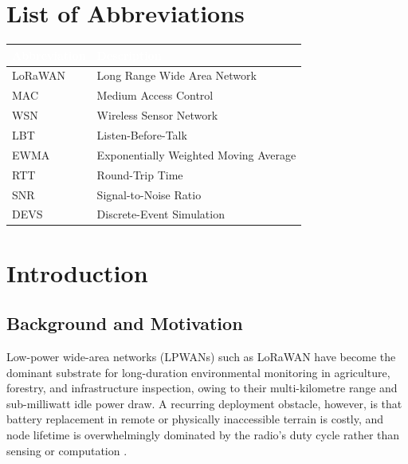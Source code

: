\documentclass[12pt,a4paper]{report}
\begin{document}
\tableofcontents
\listoffigures
\listoftables

\chapter*{List of Abbreviations}
\begin{center}
\begin{tabularx}{0.85\textwidth}{@{}lX@{}}
\toprule
\rowcolor{nustgreen}
\textcolor{white}{\bfseries Abbreviation} & \textcolor{white}{\bfseries Description} \\
\midrule
LoRaWAN & Long Range Wide Area Network \\
MAC     & Medium Access Control \\
WSN     & Wireless Sensor Network \\
LBT     & Listen-Before-Talk \\
EWMA    & Exponentially Weighted Moving Average \\
RTT     & Round-Trip Time \\
SNR     & Signal-to-Noise Ratio \\
DEVS    & Discrete-Event Simulation \\
\bottomrule
\end{tabularx}
\end{center}

\clearpage
{}

\chapter{Introduction}
\label{ch:intro}

\section{Background and Motivation}
Low-power wide-area networks (LPWANs) such as LoRaWAN have become the dominant substrate for
long-duration environmental monitoring in agriculture, forestry, and infrastructure
inspection, owing to their multi-kilometre range and sub-milliwatt idle power draw. A recurring
deployment obstacle, however, is that battery replacement in remote or physically inaccessible
terrain is costly, and node lifetime is overwhelmingly dominated by the radio's duty cycle
rather than sensing or computation \cite{bor2016lora}.
\end{document}
